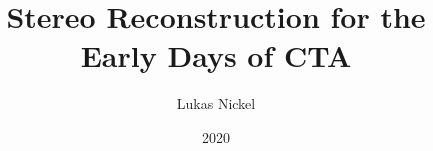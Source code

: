 \documentclass[
  oneside, %
  tucolor,       %
  BCOR=0mm,     %
  parskip=half,  %
  open=any,      %
]{tudothesis}
\author{Lukas Nickel}
\title{Stereo Reconstruction for the Early Days of CTA}
\date{2020}
\begin{document}
\frontmatter
\maketitle

\makecorrectorpage


\tableofcontents

\mainmatter

%

% 
% 
% 
% 
% 
% 
% 

\newpage
\appendix



\backmatter
\printbibliography



\cleardoublepage

% 
\end{document}
